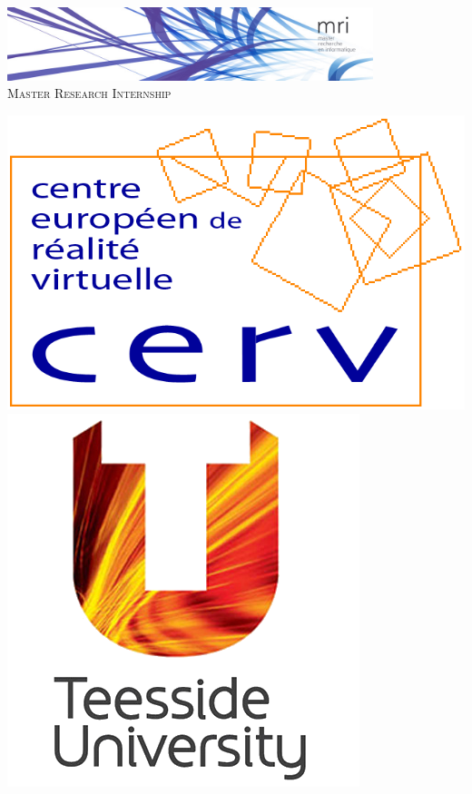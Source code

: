 \documentclass[11pt]{article}
\begin{document}
\begin{titlepage}

\begin{center}

 

\includegraphics[width=0.8\textwidth]{./header}\\[1cm]
\textsc{\Large Master Research Internship}
\vspace{1cm}

\includegraphics[height=0.1\textheight]{./logos/cerv_2}
\includegraphics[height=0.1\textheight]{./logos/teeside}

\end{center}
\end{titlepage}
\end{document}
